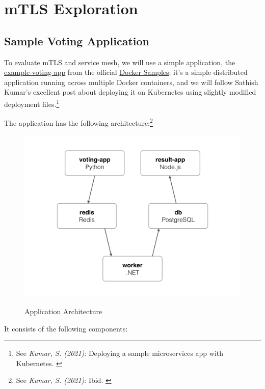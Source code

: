 %
%

\pagebreak
\section{mTLS Exploration}

\onehalfspacing

\subsection{Sample Voting Application}

To evaluate mTLS and service mesh, we will use a simple application, the \href{https://github.com/dockersamples/example-voting-app}{example-voting-app} from the official \href{https://github.com/dockersamples}{Docker Samples}; it's a simple distributed application running across multiple Docker containers, and we will follow Sathish Kumar's excellent post about deploying it on Kubernetes using slightly modified deployment files.\footnote{See \textit{Kumar, S. (2021)}: Deploying a sample microservices app with Kubernetes. \cite{votingApp}}

The application has the following architecture:\footnote{See \textit{Kumar, S. (2021)}: Ibid. \cite{votingApp}}

\begin{figure}[H]
\centering
\caption {Application Architecture}
\includegraphics[width=\linewidth]{images/architecture.png}
\label{fig:votingApp}
\end{figure}

It consists of the following components:

